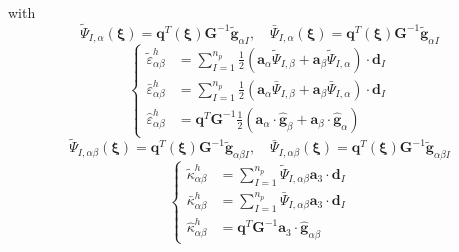 with
\begin{equation}
\tilde{\Psi}_{I,\alpha}(\boldsymbol \xi) = \boldsymbol q^T(\boldsymbol \xi) \boldsymbol G^{-1} \tilde{\boldsymbol g}_{\alpha I}, \quad
\bar{\Psi}_{I,\alpha}(\boldsymbol \xi) = \boldsymbol q^T(\boldsymbol \xi) \boldsymbol G^{-1} \tilde{\boldsymbol g}_{\alpha I}
\end{equation}
\begin{equation}
\left \{
\begin{split}
\tilde \varepsilon^h_{\alpha\beta} &= \sum_{I=1}^{n_p} \frac{1}{2}(\boldsymbol a_\alpha \tilde \Psi_{I,\beta} + \boldsymbol a_\beta \tilde \Psi_{I,\alpha}) \cdot \boldsymbol d_I \\
\bar \varepsilon^h_{\alpha\beta} &= \sum_{I=1}^{n_p} \frac{1}{2}(\boldsymbol a_\alpha \bar \Psi_{I,\beta} + \boldsymbol a_\beta \bar \Psi_{I,\alpha}) \cdot \boldsymbol d_I \\
\hat \varepsilon^h_{\alpha\beta} &= \boldsymbol q^T \boldsymbol G^{-1} \frac{1}{2}(\boldsymbol a_\alpha\cdot\hat{\boldsymbol g}_\beta + \boldsymbol a_\beta \cdot \hat{\boldsymbol g}_\alpha)
\end{split}
\right .
\end{equation}
\begin{equation}
\tilde{\Psi}_{I,\alpha\beta}(\boldsymbol \xi) = \boldsymbol q^T(\boldsymbol \xi) \boldsymbol G^{-1} \tilde{\boldsymbol g}_{\alpha\beta I}, \quad
\bar{\Psi}_{I,\alpha\beta}(\boldsymbol \xi) = \boldsymbol q^T(\boldsymbol \xi) \boldsymbol G^{-1} \tilde{\boldsymbol g}_{\alpha\beta I}
\end{equation}
\begin{equation}
\left \{
\begin{split}
\tilde \kappa^h_{\alpha\beta} &= \sum_{I=1}^{n_p} \tilde \Psi_{I,\alpha\beta}\boldsymbol a_3 \cdot \boldsymbol d_I \\
\bar \kappa^h_{\alpha\beta} &= \sum_{I=1}^{n_p} \bar \Psi_{I,\alpha\beta}\boldsymbol a_3 \cdot \boldsymbol d_I \\
\hat \kappa^h_{\alpha\beta} &= \boldsymbol q^T \boldsymbol G^{-1} \boldsymbol a_3 \cdot \hat{\boldsymbol g}_{\alpha\beta}
\end{split}
\right .
\end{equation}

